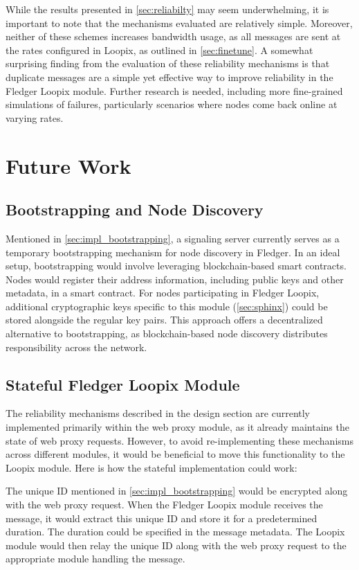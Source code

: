 \documentclass[a4paper,11pt,oneside]{report}
\begin{document}
While the results presented in \autoref{sec:reliabilty} may seem underwhelming, it is important to note that the mechanisms evaluated are relatively simple. Moreover, neither of these schemes increases bandwidth usage, as all messages are sent at the rates configured in Loopix, as outlined in \autoref{sec:finetune}. A somewhat surprising finding from the evaluation of these reliability mechanisms is that duplicate messages are a simple yet effective way to improve reliability in the Fledger Loopix module. Further research is needed, including more fine-grained simulations of failures, particularly scenarios where nodes come back online at varying rates.

\chapter{Future Work}
\label{sec:future_work}
\section{Bootstrapping and Node Discovery}

Mentioned in \autoref{sec:impl_bootstrapping}, a signaling server currently serves as a temporary bootstrapping mechanism for node discovery in Fledger. In an ideal setup, bootstrapping would involve leveraging blockchain-based smart contracts. Nodes would register their address information, including public keys and other metadata, in a smart contract. For nodes participating in Fledger Loopix, additional cryptographic keys specific to this module (\autoref{sec:sphinx}) could be stored alongside the regular key pairs. This approach offers a decentralized alternative to bootstrapping, as blockchain-based node discovery distributes responsibility across the network.

\section{Stateful Fledger Loopix Module}

The reliability mechanisms described in the design section are currently implemented primarily within the web proxy module, as it already maintains the state of web proxy requests. However, to avoid re-implementing these mechanisms across different modules, it would be beneficial to move this functionality to the Loopix module. Here is how the stateful implementation could work:

The unique ID mentioned in \autoref{sec:impl_bootstrapping} would be encrypted along with the web proxy request. When the Fledger Loopix module receives the message, it would extract this unique ID and store it for a predetermined duration. The duration could be specified in the message metadata. The Loopix module would then relay the unique ID along with the web proxy request to the appropriate module handling the message.
\end{document}
